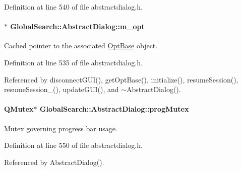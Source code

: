 Definition at line 540 of file abstractdialog.\+h.

\hypertarget{classGlobalSearch_1_1AbstractDialog_a6a5b08f59d1521ebc4769e9e9903346b}{}
\paragraph[{m\+\_\+opt}]{$\ast$ Global\+Search\+::\+Abstract\+Dialog\+::m\+\_\+opt\hspace{0.3cm}{\ttfamily [protected]}}\label{classGlobalSearch_1_1AbstractDialog_a6a5b08f59d1521ebc4769e9e9903346b}
Cached pointer to the associated \hyperlink{classGlobalSearch_1_1OptBase}{Opt\+Base} object. 

Definition at line 535 of file abstractdialog.\+h.



Referenced by disconnect\+G\+U\+I(), get\+Opt\+Base(), initialize(), resume\+Session(), resume\+Session\+\_\+(), update\+G\+U\+I(), and $\sim$\+Abstract\+Dialog().

\hypertarget{classGlobalSearch_1_1AbstractDialog_a06e3b73c319208a706aaf629a5f05165}{}
\paragraph[{prog\+Mutex}]{\setlength{\rightskip}{0pt plus 5cm}Q\+Mutex$\ast$ Global\+Search\+::\+Abstract\+Dialog\+::prog\+Mutex\hspace{0.3cm}{\ttfamily [protected]}}\label{classGlobalSearch_1_1AbstractDialog_a06e3b73c319208a706aaf629a5f05165}
Mutex governing progress bar usage. 

Definition at line 550 of file abstractdialog.\+h.



Referenced by Abstract\+Dialog().

\hypertarget{classGlobalSearch_1_1AbstractDialog_a1cf317e8206fd80628a9fe6d2ec711fc}{}
